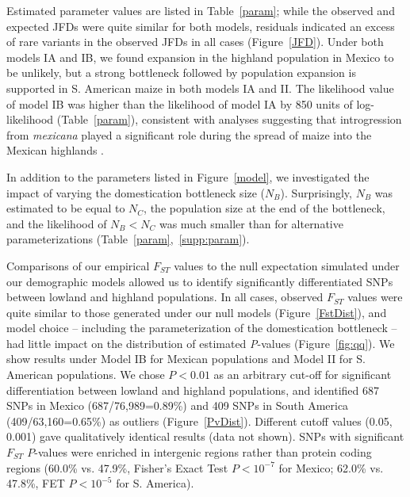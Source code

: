 Estimated parameter values are listed in Table~\ref{param}; while the observed and expected JFDs were quite similar for both models,  residuals indicated an excess of rare variants in the observed JFDs in all cases (Figure~\ref{JFD}). 
Under both models IA and IB,  we found expansion in the highland population in Mexico to be unlikely, but a strong bottleneck followed by population expansion is supported in S. American maize in both models IA and II.  
The likelihood value of model IB was higher than the likelihood of model IA by 850 units of log-likelihood (Table~\ref{param}), consistent with analyses suggesting that introgression from \textit{mexicana} played a significant role during the spread of maize into the Mexican highlands \cite[]{Profford_2013}. 

In addition to the parameters listed in Figure~\ref{model}, we investigated the impact of varying the domestication bottleneck size ($N_B$).  
Surprisingly, $N_B$ was estimated to be equal to $N_C$, the population size at the end of the bottleneck, and the likelihood of $N_B<N_C$ was much smaller than for alternative parameterizations (Table~\ref{param},~\ref{supp:param}). 

Comparisons of our empirical $F_{ST}$ values to the null expectation simulated under our demographic models allowed us to identify significantly differentiated SNPs between lowland and highland populations. In all cases, observed $F_{ST}$ values were quite similar to those generated under our null models (Figure~\ref{FstDist}), and model choice -- including the parameterization of the domestication bottleneck -- had little impact on the distribution of estimated \emph{P}-values (Figure~\ref{fig:qq}). 
We show results under Model IB for Mexican populations and Model II for S. American populations.
We chose $P<0.01$ as an arbitrary cut-off for significant differentiation between lowland and highland populations, and identified 687 SNPs in Mexico (687/76,989=0.89\%) and 409 SNPs in South America (409/63,160=0.65\%) as outliers (Figure~\ref{PvDist}). Different cutoff values (0.05, 0.001) gave qualitatively identical results (data not shown).
SNPs with significant $F_{ST}$ $P$-values were enriched in intergenic regions rather than protein coding regions (60.0\% vs. 47.9\%, Fisher's Exact Test $P < 10^{-7}$ for Mexico; 62.0\% vs. 47.8\%, FET $P<10^{-5}$ for S. America). 

